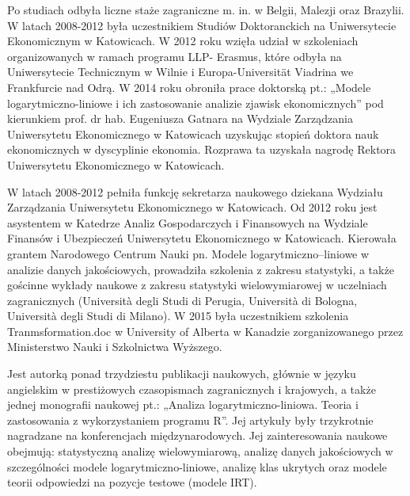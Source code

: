 \documentclass[\main/boa.tex]{subfiles}
\begin{document}
Po studiach odbyła liczne staże zagraniczne m. in. w Belgii, Malezji oraz Brazylii. W latach 2008-2012 była uczestnikiem Studiów Doktoranckich na Uniwersytecie Ekonomicznym w Katowicach. W 2012 roku wzięła udział w szkoleniach organizowanych w ramach programu LLP- Erasmus, które odbyła na Uniwersytecie Technicznym w Wilnie i Europa-Universität Viadrina we Frankfurcie nad Odrą. W 2014 roku obroniła prace doktorską pt.: „Modele logarytmiczno-liniowe i ich zastosowanie analizie zjawisk ekonomicznych” pod kierunkiem prof. dr hab. Eugeniusza Gatnara na Wydziale Zarządzania Uniwersytetu Ekonomicznego w Katowicach uzyskując stopień doktora nauk ekonomicznych w dyscyplinie ekonomia. Rozprawa ta uzyskała nagrodę Rektora Uniwersytetu Ekonomicznego w Katowicach.

W latach 2008-2012 pełniła funkcję sekretarza naukowego dziekana Wydziału Zarządzania Uniwersytetu Ekonomicznego w Katowicach. Od 2012 roku jest asystentem w Katedrze Analiz Gospodarczych i Finansowych na Wydziale Finansów i Ubezpieczeń Uniwersytetu \break Ekonomicznego w Katowicach. Kierowała grantem Narodowego Centrum Nauki pn. Modele logarytmiczno–liniowe w analizie danych jakościowych, prowadziła szkolenia z zakresu statystyki, a także gościnne wykłady naukowe z zakresu statystyki wielowymiarowej w uczelniach zagranicznych (Università degli Studi di Perugia, Università di Bologna, Università degli Studi di Milano). W 2015 była uczestnikiem szkolenia Tranmsformation.doc w University of Alberta w Kanadzie zorganizowanego przez Ministerstwo Nauki i Szkolnictwa Wyższego.

Jest autorką ponad trzydziestu publikacji naukowych, głównie w języku angielskim w presti\-żowych czasopismach zagranicznych i krajowych, a także jednej monografii naukowej pt.: „Analiza logarytmiczno-liniowa. Teoria i zastosowania z wykorzystaniem programu R”. Jej artykuły były trzykrotnie nagradzane na konferencjach międzynarodowych. Jej zainteresowania naukowe obejmują: statystyczną analizę wielowymiarową, analizę danych jakościowych w szczególności modele logarytmiczno-liniowe, analizę klas ukrytych oraz modele teorii odpowiedzi na pozycje testowe (modele IRT).
\end{document}
